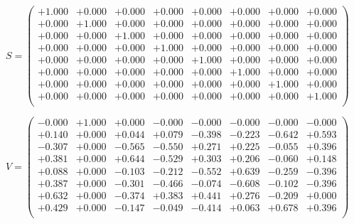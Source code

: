 \documentclass[9pt]{article}
\theoremstyle{plain}
\theoremstyle{definition}
\theoremstyle{remark}
\numberwithin{equation}{section}
\begin{document}
$S = \left(
\begin{array}{
cccccccc}
+1.000 & +0.000 & +0.000 & +0.000 & +0.000 & +0.000 & +0.000 & +0.000 \\
+0.000 & +1.000 & +0.000 & +0.000 & +0.000 & +0.000 & +0.000 & +0.000 \\
+0.000 & +0.000 & +1.000 & +0.000 & +0.000 & +0.000 & +0.000 & +0.000 \\
+0.000 & +0.000 & +0.000 & +1.000 & +0.000 & +0.000 & +0.000 & +0.000 \\
+0.000 & +0.000 & +0.000 & +0.000 & +1.000 & +0.000 & +0.000 & +0.000 \\
+0.000 & +0.000 & +0.000 & +0.000 & +0.000 & +1.000 & +0.000 & +0.000 \\
+0.000 & +0.000 & +0.000 & +0.000 & +0.000 & +0.000 & +1.000 & +0.000 \\
+0.000 & +0.000 & +0.000 & +0.000 & +0.000 & +0.000 & +0.000 & +1.000 \\
\end{array}
\right)$ \newline 

$V = \left(
\begin{array}{
cccccccc}
-0.000 & +1.000 & +0.000 & -0.000 & -0.000 & -0.000 & -0.000 & -0.000 \\
+0.140 & +0.000 & +0.044 & +0.079 & -0.398 & -0.223 & -0.642 & +0.593 \\
-0.307 & +0.000 & -0.565 & -0.550 & +0.271 & +0.225 & -0.055 & +0.396 \\
+0.381 & +0.000 & +0.644 & -0.529 & +0.303 & +0.206 & -0.060 & +0.148 \\
+0.088 & +0.000 & -0.103 & -0.212 & -0.552 & +0.639 & -0.259 & -0.396 \\
+0.387 & +0.000 & -0.301 & -0.466 & -0.074 & -0.608 & -0.102 & -0.396 \\
+0.632 & +0.000 & -0.374 & +0.383 & +0.441 & +0.276 & -0.209 & +0.000 \\
+0.429 & +0.000 & -0.147 & -0.049 & -0.414 & +0.063 & +0.678 & +0.396 \\
\end{array}
\right)$ \newline 
\end{document}

